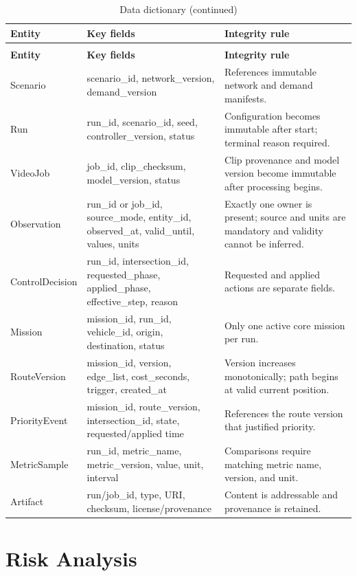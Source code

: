 \begin{longtable}{P{0.16\textwidth}P{0.28\textwidth}P{0.45\textwidth}}
\caption{Data dictionary}\label{tab:data-dictionary}\\
\toprule
\textbf{Entity} & \textbf{Key fields} & \textbf{Integrity rule}\\
\midrule\endfirsthead
\caption[]{Data dictionary (continued)}\\
\toprule
\textbf{Entity} & \textbf{Key fields} & \textbf{Integrity rule}\\
\midrule\endhead
Scenario & scenario\_id, network\_version, demand\_version & References immutable network and demand manifests.\\
Run & run\_id, scenario\_id, seed, controller\_version, status & Configuration becomes immutable after start; terminal reason required.\\
VideoJob & job\_id, clip\_checksum, model\_version, status & Clip provenance and model version become immutable after processing begins.\\
Observation & run\_id or job\_id, source\_mode, entity\_id, observed\_at, valid\_until, values, units & Exactly one owner is present; source and units are mandatory and validity cannot be inferred.\\
ControlDecision & run\_id, intersection\_id, requested\_phase, applied\_phase, effective\_step, reason & Requested and applied actions are separate fields.\\
Mission & mission\_id, run\_id, vehicle\_id, origin, destination, status & Only one active core mission per run.\\
RouteVersion & mission\_id, version, edge\_list, cost\_seconds, trigger, created\_at & Version increases monotonically; path begins at valid current position.\\
PriorityEvent & mission\_id, route\_version, intersection\_id, state, requested/applied time & References the route version that justified priority.\\
MetricSample & run\_id, metric\_name, metric\_version, value, unit, interval & Comparisons require matching metric name, version, and unit.\\
Artifact & run/job\_id, type, URI, checksum, license/provenance & Content is addressable and provenance is retained.\\
\bottomrule
\end{longtable}

\section{Risk Analysis}

